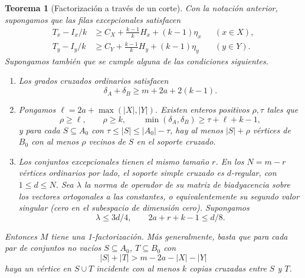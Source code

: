 \documentclass[11pt]{article}
\newtheorem{theorem}{Teorema}
\begin{document}
\begin{theorem}[Factorización a través de un corte]\label{thm:factor}
Con la notación anterior, supongamos que las filas excepcionales satisfacen
\begin{align}
  T_x-I_x/k&\ge C_X+\frac{k-1}{k}H_x+(k-1)\eta_x
      &&(x\in X),\label{eq:rowx}\\
  T_y-I_y/k&\ge C_Y+\frac{k-1}{k}H_y+(k-1)\eta_y
      &&(y\in Y).\label{eq:rowy}
\end{align}
Supongamos también que se cumple alguna de las condiciones siguientes.
\begin{enumerate}
\item Los grados cruzados ordinarios satisfacen
\[
  \delta_A+\delta_B\ge m+2a+2(k-1).
  \tag{D}\label{eq:dense}
\]
\item Pongamos \(\ell=2a+\max(|X|,|Y|)\). Existen enteros positivos \(\rho,\tau\) tales que
\[
 \rho\ge\ell,\qquad \rho\ge k,\qquad
 \min(\delta_A,\delta_B)\ge\tau+\ell+k-1,
 \tag{R}\label{eq:robust}
\]
y para cada \(S\subseteq A_0\) con \(\tau\le |S|\le |A_0|-\tau\), hay al menos \(|S|+\rho\) vértices de \(B_0\) con al menos \(\rho\) vecinos de \(S\) en el soporte cruzado.
\item Los conjuntos excepcionales tienen el mismo tamaño \(r\). En los \(N=m-r\) vértices ordinarios por lado, el soporte simple cruzado es \(d\)-regular, con \(1\le d\le N\). Sea \(\lambda\) la norma de operador de su matriz de biadyacencia sobre los vectores ortogonales a las constantes, o equivalentemente su segundo valor singular (cero en el subespacio de dimensión cero). Supongamos
\[
 \lambda\le 3d/4,\qquad 2a+r+k-1\le d/8 .
 \tag{S}\label{eq:spectral}
\]
\end{enumerate}
Entonces \(M\) tiene una 1-factorización. Más generalmente, basta que para cada par de conjuntos no vacíos \(S\subseteq A_0\), \(T\subseteq B_0\) con
\[
 |S|+|T|>m-2a-|X|-|Y|
\]
haya un vértice en \(S\cup T\) incidente con al menos \(k\) copias cruzadas entre \(S\) y \(T\).
\end{theorem}
\end{document}
